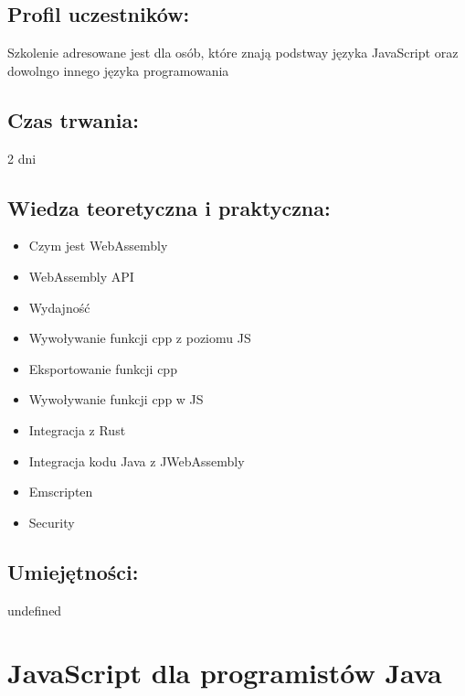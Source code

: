 \documentclass{article}[10pt]
\begin{document}
	\subsection*{Profil uczestników:}
\begin{adjustwidth}{2cm}{}
\justifying
	Szkolenie adresowane jest dla osób, które znają podstway języka JavaScript oraz dowolngo innego języka programowania
\end{adjustwidth}
	\subsection*{Czas trwania:}
\begin{adjustwidth}{2cm}{}
	2 dni
\end{adjustwidth}

	\subsection*{Wiedza teoretyczna i praktyczna:}
\begin{adjustwidth}{1.5cm}{}
	\begin{itemize}
		\item Czym jest WebAssembly
		\item WebAssembly API
		\item Wydajność
		\item Wywoływanie funkcji cpp z poziomu JS
		\item Eksportowanie funkcji cpp
		\item Wywoływanie funkcji cpp w JS
		\item Integracja z Rust
		\item Integracja kodu Java z JWebAssembly
		\item Emscripten
		\item Security
	\end{itemize}
\end{adjustwidth}

	\subsection*{Umiejętności:}
\begin{adjustwidth}{2cm}{}
\justifying
	undefined
\end{adjustwidth}

\newpage


    
	\section{JavaScript dla programistów Java}
\end{document}
